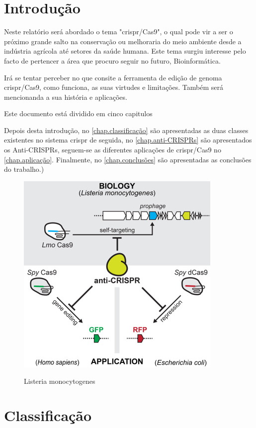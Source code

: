 \documentclass{report}
\begin{document}
\chapter{Introdução}
\label{chap.introducao}

Neste relatório será abordado o tema "\ac{crispr}/Cas9", o qual pode vir a ser o próximo grande salto na conservação ou melhoraria do meio ambiente desde a indústria agrícola até setores da saúde humana. Este tema surgiu interesse pelo facto de pertencer a área que procuro seguir no futuro, Bioinformática.

Irá se tentar perceber no que consite a ferramenta de edição de genoma \ac{crispr}/Cas9, como funciona, as suas virtudes e limitações. Também será mencionanda a sua história e aplicações.

Este documento está dividido em cinco capitulos \par

Depois desta introdução,
no \autoref{chap.classificação} são apresentadas as duas classes existentes no sistema \ac{crispr} de seguida,
no \autoref{chap.anti-CRISPRs} são apresentados os Anti-CRISPRs,
seguem-se as diferentes aplicações de \ac{crispr}/Cas9 no \autoref{chap.aplicação}.
Finalmente, no \autoref{chap.conclusões} são apresentadas
as conclusões do trabalho.)
\begin{figure}[h]
\center
\includegraphics[scale=0.8]{pog}
\label{pog}
\caption{Listeria monocytogenes}
\end{figure}

\chapter{Classificação}
\label{chap.classificação}
\end{document}
